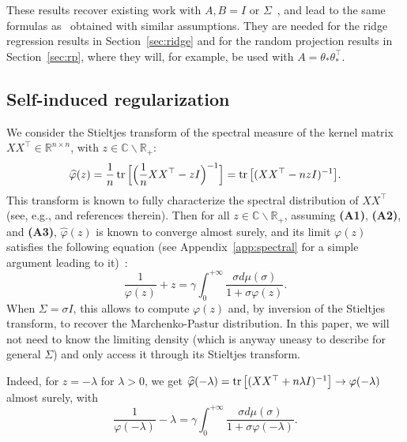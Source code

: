 \documentclass[11pt]{article}
\newcommand{\BEQ}{\begin{equation}}
\newcommand{\EEQ}{\end{equation}}
\newcommand{\tr}{\mathop{ \rm tr}}
\newcommand{\idm}{I}
\newcommand{\rb}{\mathbb{R}}
\newcommand{\mysec}[1]{Section~\ref{sec:#1}}
\def \hphi{ \widehat{\varphi} }
\begin{document}
These results recover existing work with $A,B = \idm$ or $\Sigma$~\cite{ledoit2011eigenvectors,dobriban2018high}, and lead to the same formulas as~\cite{dar2021common,lejeune2022asymptotics} obtained with similar assumptions. They are needed for the ridge regression results in \mysec{ridge} and for the random projection results in \mysec{rp}, where they will, for example, be used with $A = \theta_\ast \theta_\ast^\top$.

\subsection{Self-induced regularization}
\label{sec:implicitreg}

We consider the Stieltjes transform of the spectral measure of the kernel matrix $XX^\top \in \rb^{n \times n}$, with $z \in \mathbb{C} \backslash \rb_+$:
$$
\hphi(z) = \frac{1}{n} \tr \Big[ \Big(
\frac{1}{n} XX^\top  - z \idm \Big)^{-1}
\Big]
= \tr \big[ ( XX^\top - nz\idm)^{-1}\big].
$$
This transform is known to fully characterize the spectral distribution of $XX^\top$ (see, e.g., \cite{bai2010spectral} and references therein).
Then for all $z \in \mathbb{C} \backslash \rb_+$, assuming
\textbf{(A1)}, \textbf{(A2)}, and \textbf{(A3)},
$\hphi(z)$ is known to converge almost surely, and its limit $\varphi(z)$ satisfies the following equation (see Appendix~\ref{app:spectral} for a simple argument leading to it)~\cite{bai2010spectral,ledoit2011eigenvectors}:
\BEQ
\label{eq:varphiz}
\frac{1}{\varphi(z)} + z = \gamma \int_0^{+\infty} \frac{ \sigma d\mu(\sigma)}{1 + \sigma \varphi(z)}.
\EEQ
When $\Sigma = \sigma \idm$, this allows to compute $\varphi(z)$ and, by inversion of the Stieltjes transform, to recover the Marchenko-Pastur distribution. In this paper, we will not need to know the limiting density (which is anyway uneasy to describe for general $\Sigma$) and only access it through its Stieltjes transform.

Indeed, for $z = -\lambda$ for $\lambda > 0$, we get $
\hphi(-\lambda) = \tr \big[ (XX ^\top + n \lambda \idm)^{-1} \big] \to \varphi(-\lambda) $ almost surely, with
\BEQ
\label{eq:varphilambda}
\frac{1}{\varphi(-\lambda)} - \lambda = \gamma \int_0^{+\infty} \frac{ \sigma d\mu(\sigma)}{1 + \sigma \varphi(-\lambda)}.
\EEQ
 
\end{document}
